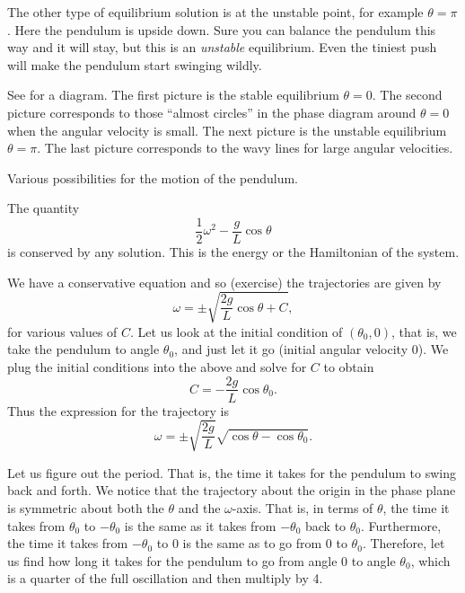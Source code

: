 \documentclass{ximera}
\begin{document}
The other type of equilibrium solution is at the unstable point, for example $\theta = \pi$.  Here the pendulum is upside down.  Sure you can balance the pendulum this way and it will stay, but this is an \emph{unstable} equilibrium. Even the tiniest push will make the pendulum start swinging wildly.

See  for a diagram.  The first picture is the stable equilibrium $\theta = 0$.  The second picture corresponds to those ``almost circles'' in the phase diagram around $\theta =0$ when the angular velocity is small.  The next picture is the unstable equilibrium $\theta = \pi$.  The last picture corresponds to the wavy lines for large angular velocities.

\begin{myfig}
    \capstart
    
    \caption{Various possibilities for the motion of the pendulum. \label{fig:nlin-pend}}
\end{myfig}

The quantity 
\begin{equation*}
    \frac{1}{2} \omega^2  - \frac{g}{L} \cos \theta 
\end{equation*}
is conserved by any solution.  This is the energy or the Hamiltonian of the system.

We have a conservative equation and so (exercise) the trajectories are given by
\begin{equation*}
    \omega = \pm \sqrt{ \frac{2g}{L} \cos \theta + C} ,
\end{equation*}
for various values of $C$. Let us look at the initial condition of $(\theta_0,0)$, that is, we take the pendulum to angle $\theta_0$, and just let it go (initial angular velocity 0). We plug the initial conditions into the above and solve for $C$ to obtain
\begin{equation*}
    C = - \frac{2g}{L} \cos \theta_0 .
\end{equation*}
Thus the expression for the trajectory is
\begin{equation*}
    \omega = \pm \sqrt{ \frac{2g}{L}} \sqrt{ \cos \theta - \cos \theta_0 } .
\end{equation*}

Let us figure out the period.  That is, the time it takes for the pendulum to swing back and forth. We notice that the trajectory about the origin in the phase plane is symmetric about both the $\theta$ and the $\omega$-axis.  That is, in terms of $\theta$, the time it takes from $\theta_0$ to $-\theta_0$ is the same as it takes from $-\theta_0$ back to $\theta_0$.  Furthermore, the time it takes from $-\theta_0$ to $0$ is the same as to go from $0$ to $\theta_0$.  Therefore, let us find how long it takes for the pendulum to go from angle 0 to angle $\theta_0$, which is a quarter of the full oscillation and then multiply by 4.
\end{document}
